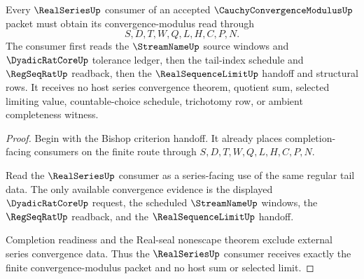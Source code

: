 \begin{theorem}
\label{thm:cauchy-convergence-modulus-realseries-consumer-handoff}
Every $\RealSeriesUp$ consumer of an accepted $\CauchyConvergenceModulusUp$ packet must obtain its convergence-modulus read through
$$
S,D,T,W,Q,L,H,C,P,N.
$$
The consumer first reads the $\StreamNameUp$ source windows and $\DyadicRatCoreUp$ tolerance ledger, then the tail-index schedule and $\RegSeqRatUp$ readback, then the $\RealSequenceLimitUp$ handoff and structural rows. It receives no host series convergence theorem, quotient sum, selected limiting value, countable-choice schedule, trichotomy row, or ambient completeness witness.
\end{theorem}
\begin{proof}
Begin with the Bishop criterion handoff. It already places completion-facing consumers on the finite route through $S,D,T,W,Q,L,H,C,P,N$.

Read the $\RealSeriesUp$ consumer as a series-facing use of the same regular tail data. The only available convergence evidence is the displayed $\DyadicRatCoreUp$ request, the scheduled $\StreamNameUp$ windows, the $\RegSeqRatUp$ readback, and the $\RealSequenceLimitUp$ handoff.

Completion readiness and the Real-seal nonescape theorem exclude external series convergence data. Thus the $\RealSeriesUp$ consumer receives exactly the finite convergence-modulus packet and no host sum or selected limit.
\end{proof}

